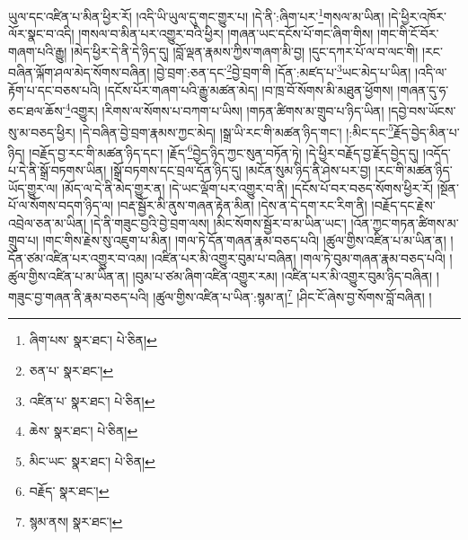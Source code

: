 ཡུལ་དང་འཛིན་པ་མིན་ཕྱིར་རོ། །འདི་ཡི་ཡུལ་དུ་གང་གྱུར་པ། །དེ་ནི་:ཞིག་པར་\footnote{ཞིག་པས་  སྣར་ཐང་།  པེ་ཅིན། }གསལ་མ་ཡིན། །དེ་ཕྱིར་འཁོར་ལོར་སྣང་བ་འདི། །གསལ་བ་མིན་པར་འགྱུར་བའི་ཕྱིར། །གཞན་ཡང་དངོས་པོ་གང་ཞིག་གིས། །གང་གི་ངོ་བོར་གཞག་པའི་རྒྱུ། །མེད་ཕྱིར་དེ་ནི་དེ་ཉིད་དུ། །བློ་ལྡན་རྣམས་ཀྱིས་གཞག་མི་བྱ། །དུང་དཀར་པོ་ལ་བ་ལང་གི། །རང་བཞིན་ལྐོག་ཤལ་མེད་སོགས་བཞིན། །བྱེ་བྲག་:ཅན་དང་\footnote{ཅན་པ་  སྣར་ཐང་། }བྱེ་བྲག་གི །དོན་:མཛད་པ་\footnote{འཛིན་པ་  སྣར་ཐང་།  པེ་ཅིན། }ཡང་མེད་པ་ཡིན། །འདི་ལ་རྟོག་པ་དང་བཅས་པའི། །དངོས་པོར་གཞག་པའི་རྒྱུ་མཚན་མེད། །བ་ཁྲ་བོ་སོགས་མི་མཐུན་ཕྱོགས། །གཞན་དུ་ཧ་ཅང་ཐལ་ཆོས་\footnote{ཆེས་  སྣར་ཐང་།  པེ་ཅིན། }འགྱུར། །རིགས་ལ་སོགས་པ་བཀག་པ་ཡིས། །གཏན་ཚིགས་མ་གྲུབ་པ་ཉིད་ཡིན། །དབྱེ་བས་ཡོངས་སུ་མ་བཅད་ཕྱིར། །དེ་བཞིན་བྱེ་བྲག་རྣམས་ཀྱང་མེད། །སྒྲ་ཡི་རང་གི་མཚན་ཉིད་གང་། །:མིང་དང་\footnote{མིང་ཡང་  སྣར་ཐང་།  པེ་ཅིན། }རྗོད་བྱེད་མིན་པ་ཉིད། །བརྗོད་བྱ་རང་གི་མཚན་ཉིད་དང་། །རྗོད་\footnote{བརྗོད་  སྣར་ཐང་། }བྱེད་ཉིད་ཀྱང་སུན་བཏོན་ཏེ། །དེ་ཕྱིར་བརྗོད་བྱ་རྗོད་བྱེད་དུ། །འདོད་པ་དེ་ནི་སྒྲོ་བཏགས་ཡིན། །སྒྲོ་བཏགས་དང་བྲལ་དོན་ཉིད་དུ། །མངོན་སུམ་ཉིད་ནི་ཤེས་པར་བྱ། །རང་གི་མཚན་ཉིད་ཡོད་གྱུར་ལ། །མོད་ལ་དེ་ནི་མེད་གྱུར་ན། །དེ་ཡང་ལྡོག་པར་འགྱུར་བ་ནི། །དངོས་པོ་བར་བཅད་སོགས་ཕྱིར་རོ། །སྔོན་པོ་ལ་སོགས་བདག་ཉིད་ལ། །བརྡ་སྦྱོར་མི་ནུས་གཞན་རྟེན་མིན། །དེས་ན་དེ་དག་རང་རིག་ནི། །བརྗོད་དང་རྗེས་འབྲེལ་ཅན་མ་ཡིན། །དེ་ནི་གཟུང་བྱའི་བྱེ་བྲག་ལས། །མིང་སོགས་སྦྱོར་བ་མ་ཡིན་ཡང་། །འོན་ཀྱང་གཏན་ཚིགས་མ་གྲུབ་པ། །གང་གིས་རྗེས་སུ་འཇུག་པ་མིན། །གལ་ཏེ་དོན་གཞན་རྣམ་བཅད་པའི། །ཚུལ་གྱིས་འཛིན་པ་མ་ཡིན་ན། །དོན་ཙམ་འཛིན་པར་འགྱུར་བ་འམ། །འཛིན་པར་མི་འགྱུར་བུམ་པ་བཞིན། །གལ་ཏེ་བུམ་གཞན་རྣམ་བཅད་པའི། །ཚུལ་གྱིས་འཛིན་པ་མ་ཡིན་ན། །བུམ་པ་ཙམ་ཞིག་འཛིན་འགྱུར་རམ། །འཛིན་པར་མི་འགྱུར་བུམ་ཉིད་བཞིན། །གཟུང་བྱ་གཞན་ནི་རྣམ་བཅད་པའི། །ཚུལ་གྱིས་འཛིན་པ་ཡིན་:སྙམ་ན།\footnote{སྙམ་ནས།  སྣར་ཐང་། } །ཤིང་ངོ་ཞེས་བྱ་སོགས་བློ་བཞིན། །
